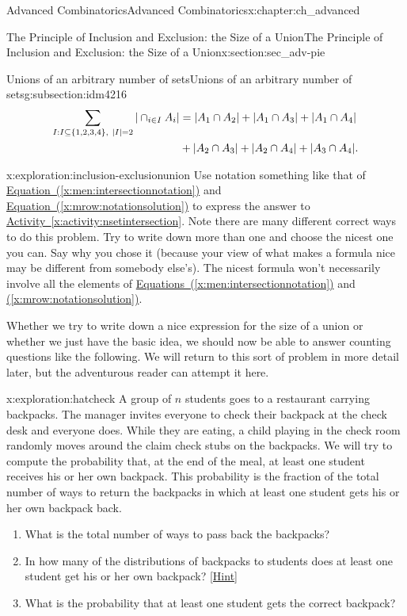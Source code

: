 \documentclass[oneside,10pt,]{book}
\numberwithin{equation}{chapter}
\newcommand{\amp}{&}
\begin{document}
\begin{chapterptx}{Advanced Combinatorics}{}{Advanced Combinatorics}{}{}{x:chapter:ch_advanced}
\begin{sectionptx}{The Principle of Inclusion and Exclusion: the Size of a Union}{}{The Principle of Inclusion and Exclusion: the Size of a Union}{}{}{x:section:sec_adv-pie}
\begin{subsectionptx}{Unions of an arbitrary number of sets}{}{Unions of an arbitrary number of sets}{}{}{g:subsection:idm4216}
\begin{align}
\sum_{I:I \subseteq \{1,2,3,4\}, \ |I|=2} |\cap_{i\in I}
A_i|  \amp =  |A_1\cap A_2|+ |A_1\cap A_3|
+|A_1\cap A_4|\notag\\
\amp +  |A_2\cap A_3|+
|A_2\cap A_4| +|A_3\cap A_4|.\label{x:mrow:notationsolution}
\end{align}
%
\begin{exploration}{}{x:exploration:inclusion-exclusionunion}%
Use notation something like that of \hyperref[x:men:intersectionnotation]{Equation~(\ref{x:men:intersectionnotation})} and \hyperref[x:mrow:notationsolution]{Equation~(\ref{x:mrow:notationsolution})} to express the answer to \hyperref[x:activity:nsetintersection]{Activity~\ref{x:activity:nsetintersection}}. Note there are many different correct ways to do this problem. Try to write down more than one and choose the nicest one you can. Say why you chose it (because your view of what makes a formula nice may be different from somebody else's). The nicest formula won't necessarily involve all the elements of \hyperref[x:men:intersectionnotation]{Equations~(\ref{x:men:intersectionnotation})} and \hyperref[x:mrow:notationsolution]{(\ref{x:mrow:notationsolution})}.%
\end{exploration}
Whether we try to write down a nice expression for the size of a union or whether we just have the basic idea, we should now be able to answer counting questions like the following.  We will return to this sort of problem in more detail later, but the adventurous reader can attempt it here.%
\begin{exploration}{}{x:exploration:hatcheck}%
A group of \(n\) students goes to a restaurant carrying backpacks. The manager invites everyone to check their backpack at the check desk and everyone does. While they are eating, a child playing in the check room randomly moves around the claim check stubs on the backpacks. We will try to compute the probability that, at the end of the meal, at least one student receives his or her own backpack.  This probability is the fraction of the total number of ways to return the backpacks in which at least one student gets his or her own backpack back.%
\begin{enumerate}[font=\bfseries,label=(\alph*),ref=\alph*]
\item{}What is the total number of ways to pass back the backpacks?%
\item{}In how many of the distributions of backpacks to students does at least one student get his or her own backpack?%
\space\hspace*{0pt}\hfill{\tiny\hyperlink{g:hint:idm4269-back}{[Hint]}}\item{}What is the probability that at least one student gets the correct backpack?%

\end{enumerate}
\end{exploration}
\end{subsectionptx}
\end{sectionptx}
\end{chapterptx}
\end{document}
